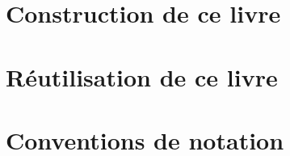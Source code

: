 		

	\section{Construction de ce livre}
	\label{ch_makingof}

		

	\section{Réutilisation de ce livre}
	\label{ch_remix}

		

	\clearpage	
	\section{Conventions de notation}
		
		

	\clearpage\restoredefaultfootoffset%
	\restoregeometry%
	\restoredefaultsectionstyle%

